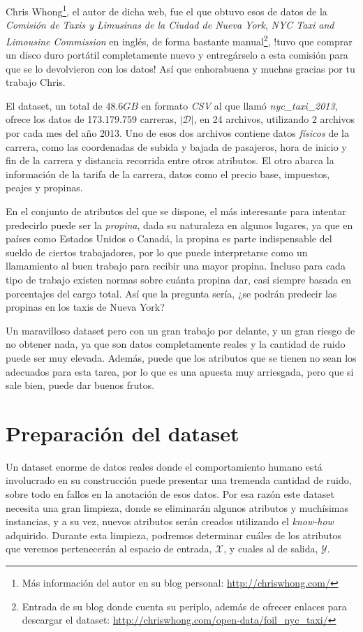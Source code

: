 Chris Whong\footnote{Más información del autor en su blog personal: \url{http://chriswhong.com/}}, el autor de dicha web, fue el que obtuvo esos de datos de la \emph{Comisión de Taxis y Limusinas de la Ciudad de Nueva York}, \emph{NYC Taxi and Limousine Commission} en inglés, de forma bastante manual\footnote{Entrada de su blog donde cuenta su periplo, además de ofrecer enlaces para descargar el dataset: \url{http://chriswhong.com/open-data/foil_nyc_taxi/}}, !tuvo que comprar un disco duro portátil completamente nuevo y entregárselo a esta comisión para que se lo devolvieron con los datos! Así que enhorabuena y muchas gracias por tu trabajo Chris.

El dataset, un total de $48.6GB$ en formato \emph{CSV} al que llamó \emph{nyc\_taxi\_2013}, ofrece los datos de 173.179.759 carreras, $|\mathcal{D}|$, en 24 archivos, utilizando 2 archivos por cada mes del año 2013. Uno de esos dos archivos contiene datos \emph{físicos} de la carrera, como las coordenadas de subida y bajada de pasajeros, hora de inicio y fin de la carrera y distancia recorrida entre otros atributos. El otro abarca la información de la tarifa de la carrera, datos como el precio base, impuestos, peajes y propinas.

En el conjunto de atributos del que se dispone, el más interesante para intentar predecirlo puede ser la \emph{propina}, dada su naturaleza en algunos lugares, ya que en países como Estados Unidos o Canadá, la propina es parte indispensable del sueldo de ciertos trabajadores, por lo que puede interpretarse como un llamamiento al buen trabajo para recibir una mayor propina. Incluso para cada tipo de trabajo existen normas sobre cuánta propina dar, casi siempre basada en porcentajes del cargo total. Así que la pregunta sería, ¿se podrán predecir las propinas en los taxis de Nueva York?

Un maravilloso dataset pero con un gran trabajo por delante, y un gran riesgo de no obtener nada, ya que son datos completamente reales y la cantidad de ruido puede ser muy elevada. Además, puede que los atributos que se tienen no sean los adecuados para esta tarea, por lo que es una apuesta muy arriesgada, pero que si sale bien, puede dar buenos frutos. 

\section{Preparación del dataset} \label{sec:5.2}

Un dataset enorme de datos reales donde el comportamiento humano está involucrado en su construcción puede presentar una tremenda cantidad de ruido, sobre todo en fallos en la anotación de esos datos. Por esa razón este dataset necesita una gran limpieza, donde se eliminarán algunos atributos y muchísimas instancias, y a su vez, nuevos atributos serán creados utilizando el \emph{know-how} adquirido. Durante esta limpieza, podremos determinar cuáles de los atributos que veremos pertenecerán al espacio de entrada, $\mathcal{X}$, y cuales al de salida, $\mathcal{Y}$.


